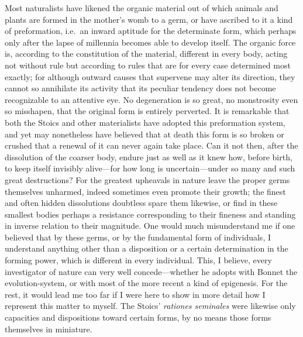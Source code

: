 \documentclass[12pt,a4paper]{article}
\begin{document}
Most naturalists have likened the organic material out of which animals and
plants are formed in the mother's womb to a germ, or have ascribed to it a kind of
preformation, i.e.\ an inward aptitude
for the determinate form, which perhaps only after the lapse of millennia becomes
able to develop itself. The organic force is, according to the constitution of
the material, different in every body, acting not without rule but according to
rules that are for every case determined most exactly; for although outward
causes that supervene may alter its direction, they cannot so annihilate its
activity that its peculiar tendency does not become recognizable to an attentive
eye. No degeneration is so great, no monstrosity even so misshapen, that the
original form is entirely perverted. It is remarkable that both the Stoics and
other materialists have adopted this preformation system, and yet may nonetheless
have believed that at death this form is so broken or crushed that a renewal of it
can never again take place. Can it not then, after the dissolution of the coarser
body, endure just as well as it knew how, before birth, to keep itself invisibly
alive---for how long is uncertain---under so many and such great destructions? For
the greatest upheavals in nature leave the proper germs themselves unharmed,
indeed sometimes even promote their growth; the finest and often hidden
dissolutions doubtless spare them likewise, or find in these smallest bodies
perhaps a resistance corresponding to their fineness and standing in inverse
relation to their magnitude. One would much misunderstand me if one believed that
by these germs, or by the fundamental form of individuals, I understand anything
other than a disposition or a
certain determination in the forming power, which is different in every
individual. This, I believe, every investigator of nature can very well
concede---whether he adopts with Bonnet the evolution-system, or with most of the
more recent a kind of epigenesis. For the rest, it would lead me too far if I
were here to show in more detail how I represent this matter to myself. The
Stoics' \emph{rationes seminales} were likewise only capacities and dispositions
toward certain forms, by no means those forms themselves in miniature.
\end{document}
